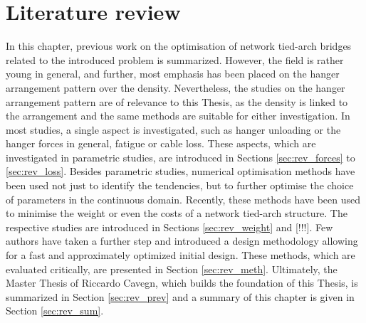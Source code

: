 \section{Literature review}\label{sec:review}
In this chapter, previous work on the optimisation of network tied-arch bridges related to the introduced problem is summarized. However, the field is rather young in general, and further, most emphasis has been placed on the hanger arrangement pattern over the density. Nevertheless, the studies on the hanger arrangement pattern are of relevance to this Thesis, as the density is linked to the arrangement and the same methods are suitable for either investigation. In most studies, a single aspect is investigated, such as hanger unloading or the hanger forces in general, fatigue or cable loss. These aspects, which are investigated in parametric studies, are introduced in Sections \ref{sec:rev_forces} to \ref{sec:rev_loss}. Besides parametric studies, numerical optimisation methods have been used not just to identify the tendencies, but to further optimise the choice of parameters in the continuous domain. Recently, these methods have been used to minimise the weight or even the costs of a network tied-arch structure. The respective studies are introduced in Sections \ref{sec:rev_weight} and [!!!]. Few authors have taken a further step and introduced a design methodology allowing for a fast and approximately optimized initial design. These methods, which are evaluated critically, are presented in Section \ref{sec:rev_meth}. Ultimately, the Master Thesis of Riccardo Cavegn, which builds the foundation of this Thesis, is summarized in Section \ref{sec:rev_prev} and a summary of this chapter is given in Section \ref{sec:rev_sum}.

